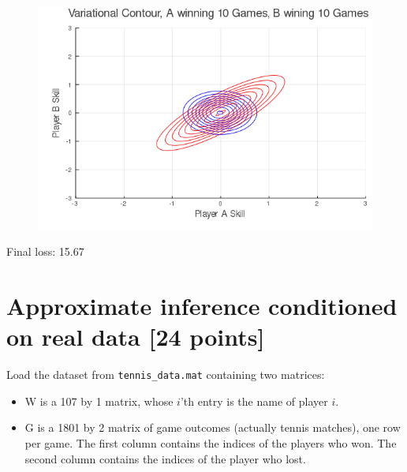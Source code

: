 \documentclass{article}
\begin{document}
\begin{figure}[h]
  \centering
  \includegraphics[width=12cm,keepaspectratio]{plots/variational_fit_A10_B10.png}
\end{figure}

Final loss: 15.67

\pagebreak
\section{Approximate inference conditioned on real data [24 points]}
Load the dataset from \texttt{tennis\_data.mat} containing two matrices:

\begin{itemize}
	\item W is a 107 by 1 matrix, whose $i$’th entry is the name of player $i$.
	\item G is a 1801 by 2 matrix of game outcomes (actually tennis matches), one row per game.
The first column contains the indices of the players who won.
The second column contains the indices of the player who lost.
\end{itemize}
\end{document}
